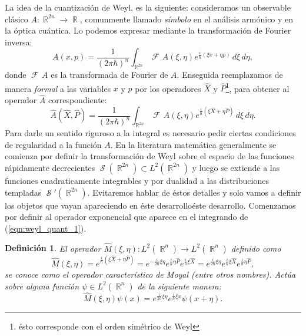 \documentclass[a4paper]{report}
\DeclareMathOperator{\R}{\mathbb{R}}
\DeclareMathOperator{\Sz}{\mathcal S}
\DeclareMathOperator{\Fr}{\mathcal{F}\!}
\newtheorem{definition}{Definición}
\begin{document}
  La idea de la cuantización de Weyl, es la siguiente:
  consideramos un observable clásico $A : \R^{2n} \to \R$,
  comunmente llamado \textit{símbolo} en el análisis
  armónico y en la óptica cuántica. Lo podemos expresar
  mediante la transformación de Fourier inversa:
  \begin{equation}
    A(x,p)
    = \frac{1}{(2\pi\hbar)^{n}} \int_{\R^{2n}} \Fr A(\xi,
    \eta) e^{\frac{i}{\hbar} \left( \xi x + \eta p\right) }
    \, d\xi \, d\eta,
  \end{equation}
  donde $\Fr A$ es la transformada de Fourier de $A$.
  Enseguida reemplazamos de manera \textit{formal} a las
  variables $x$ y $p$ por los operadores $\hat{X}$ y
  $\hat{P}$\footnote{ésto corresponde con el orden simétrico de
  Weyl}, para obtener al operador $\hat{A}$ correspondiente:
  \begin{equation}
    \label{eqn:weyl_quant_1}
    \hat{A}(\hat{X},\hat{P})
    = \frac{1}{(2\pi\hbar)^{n}} \int_{\R^{2n}} \Fr
    A(\xi,\eta) e^{\frac{i}{\hbar} \left( \xi \hat{X} + \eta
    \hat{P}\right) } \, d\xi \, d\eta.
  \end{equation}
  Para darle un sentido riguroso a la integral es necesario
  pedir ciertas condiciones de regularidad a la función $A$.
  En la literatura matemática generalmente se comienza por
  definir la transformación de Weyl sobre el espacio de las
  funciones rápidamente decrecientes $\Sz(\R^{2n}) \subset
  L^2(\R^{2n})$ y luego se extiende a las funciones
  cuadraticamente integrables y por dualidad a las
  distribuciones templadas $\Sz'(\R^{2n})$. Evitaremos
  hablar de éstos detalles y solo vamos a definir los
  objetos que vayan apareciendo en éste desarrolloéste
  desarrollo. Comenzamos por definir al operador exponencial
  que aparece en el integrando de (\ref{eqn:weyl_quant_1}).
  \begin{definition}
    El operador $\hat{M}(\xi, \eta) : L^2(\R^{n}) \to
    L^2(\R^{n})$ definido como
    \begin{equation*}
      \hat{M}(\xi,\eta)
      = e^{\frac{i}{\hbar} \left( \xi \hat{X} + \eta \hat{P}
      \right) }
      = e^{-\frac{i}{2\hbar} \xi \eta} e^{\frac{i}{\hbar}
      \eta \hat{P}} e^{\frac{i}{\hbar} \xi \hat{X}}
      = e^{\frac{i}{2\hbar} \xi \eta} e^{\frac{i}{\hbar}
      \xi \hat{X}} e^{\frac{i}{\hbar} \eta \hat{P}},
    \end{equation*} 
    se conoce como el operador característico de Moyal
    (entre otros nombres). Actúa sobre alguna función $\psi
    \in L^2(\R^{n})$ de la siguiente manera:
    \begin{equation}
      \hat{M}(\xi,\eta)\psi(x)
      = e^{\frac{i}{2\hbar} \xi\eta} e^{\frac{i}{\hbar} \xi
      x} \psi(x + \eta).
    \end{equation}
  \end{definition}
\end{document}
